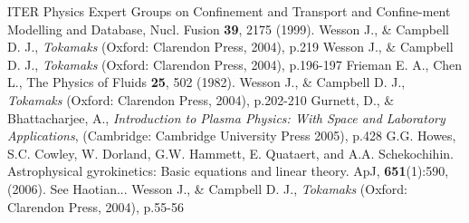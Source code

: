 \documentclass[12pt]{article}
\numberwithin{equation}{subsection}
\begin{document}
\begin{thebibliography}{0}
   
    ITER Physics Expert Groups on Confinement and Transport and Confine-ment Modelling and Database, Nucl. Fusion \textbf{39}, 2175 (1999).
    Wesson J., \& Campbell D. J., \textit{Tokamaks} (Oxford: Clarendon Press, 2004), p.219
    Wesson J., \& Campbell D. J., \textit{Tokamaks} (Oxford: Clarendon Press, 2004), p.196-197
    Frieman E. A., Chen L., The Physics of Fluids \textbf{25}, 502 (1982).
    Wesson J., \& Campbell D. J., \textit{Tokamaks} (Oxford: Clarendon Press, 2004), p.202-210
    Gurnett, D., \& Bhattacharjee, A., \textit{Introduction to Plasma Physics: With Space and Laboratory Applications},
                       (Cambridge: Cambridge University Press 2005), p.428
    G.G. Howes, S.C. Cowley, W. Dorland, G.W. Hammett, E. Quataert, and A.A. Schekochihin.
                         Astrophysical gyrokinetics: Basic equations and linear theory. ApJ, \textbf{651}(1):590, (2006).
    See Haotian...
    Wesson J., \& Campbell D. J., \textit{Tokamaks} (Oxford: Clarendon Press, 2004), p.55-56

\end{thebibliography}
    
\end{document}
